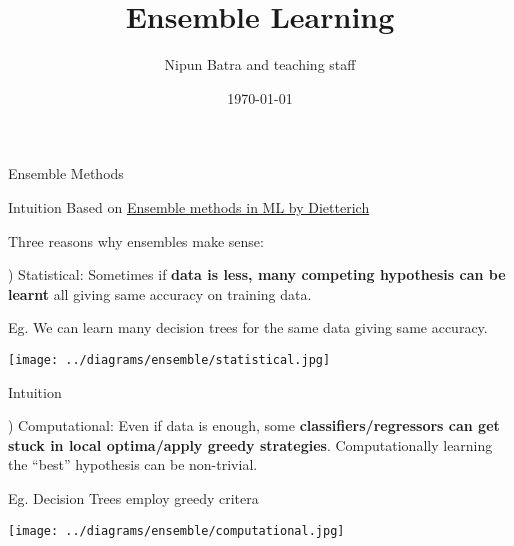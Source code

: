 \documentclass{beamer}
\title{Ensemble Learning}
\date{\today}
\author{Nipun Batra and teaching staff}
\institute{IIT Gandhinagar}
\begin{document}
\maketitle

\begin{frame}{Ensemble Methods}
\end{frame}


\begin{frame}{Intuition}
  \pause Based on \hyperlink{https://web.engr.oregonstate.edu/~tgd/publications/mcs-ensembles.pdf}{Ensemble methods in ML by Dietterich}

  Three reasons why ensembles make sense:

  ) Statistical: Sometimes if \textbf{data is less, many competing hypothesis can be learnt} all giving same accuracy on training data.

  \pause Eg. We can learn many decision trees for the same data giving same accuracy.

  \texttt{[image: ../diagrams/ensemble/statistical.jpg]}

\end{frame}
  
\begin{frame}{Intuition}

  ) Computational: Even if data is enough, some \textbf{classifiers/regressors can get stuck in local optima/apply greedy strategies}. Computationally learning the ``best'' hypothesis can be non-trivial.

  \pause Eg. Decision Trees employ greedy critera

  \texttt{[image: ../diagrams/ensemble/computational.jpg]}

\end{frame}
  
\end{document}
